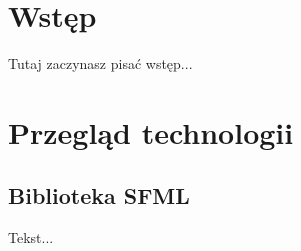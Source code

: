 \documentclass[12pt, a4paper, oneside]{report}
\begin{document}

\tableofcontents
\listoffigures
\listoftables

\clearpage


\chapter{Wstęp}
Tutaj zaczynasz pisać wstęp...

\chapter{Przegląd technologii}
\section{Biblioteka SFML}
Tekst...
\end{document}
